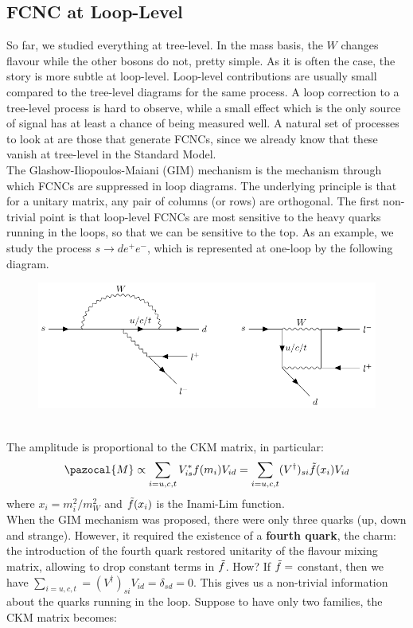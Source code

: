 \documentclass[../main.tex]{subfiles}
\begin{document}
\subsection{FCNC at Loop-Level}
So far, we studied everything at tree-level. In the mass basis, the $W$ changes flavour while the other bosons do not, pretty simple. As it is often the case, the story is more subtle at loop-level. Loop-level contributions are usually small compared to the tree-level diagrams for the same process. A loop correction to a tree-level process is hard to observe, while a small effect which is the only source of signal has at least a chance of being measured well. A
natural set of processes to look at are those that generate FCNCs, since we already know that these vanish at tree-level in the Standard Model.\\
The Glashow-Iliopoulos-Maiani (GIM) mechanism is the mechanism through which FCNCs are suppressed in loop diagrams. The underlying principle is that for a unitary matrix, any pair of columns (or rows) are orthogonal. The first non-trivial point is that
loop-level FCNCs are most sensitive to the heavy quarks running in the loops, so that we can be sensitive to the top. As an example, we study the process $s\to de^+e^-$, which is represented at one-loop by the following diagram.\\
\begin{figure}[h]
    \centering
    \includegraphics{Images/gim.pdf}
    \caption*{}
\end{figure}\\
\newline
The amplitude is proportional to the CKM matrix, in particular:
\[
\pazocal{M}\propto\sum_{i=u,c,t}V_{is}^*f(m_i)V_{id}=\sum_{i=u,c,t}(V^\dagger)_{si}\Tilde{f}(x_i)V_{id}
\]
where $x_i=m_i^2/m_W^2$ and $\Tilde{f}(x_i)$ is the Inami-Lim function.\\
When the GIM mechanism was proposed, there were only three quarks (up, down and strange). However, it required the existence of a \textbf{fourth quark}, the charm: the introduction of the fourth quark restored unitarity of the flavour mixing matrix, allowing to drop constant terms in $\Tilde{f}$. How? If $\Tilde{f}=$ constant, then we have $\sum_{i=u,c,t}=(V^\dagger)_{si}V_{id}=\delta_{sd}=0$. This gives us a non-trivial information about the quarks running in the loop. Suppose to have only two families, the CKM matrix becomes:
\end{document}
